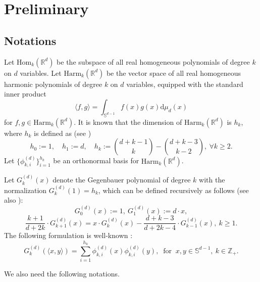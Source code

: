 \documentclass[11pt]{article}
\theoremstyle{definition}
\theoremstyle{remark}
\begin{document}
\section{Preliminary}

\subsection{Notations}

Let $\text{Hom}_{k}(\mathbb{R}^d)$ be the subspace of all real homogeneous polynomials of degree $k$ on $d$ variables.
Let $\text{Harm}_{k}(\mathbb{R}^d)$ be the  vector space of all real homogeneous harmonic
polynomials of degree $k$ on $d$ variables, equipped with the standard inner product
\begin{equation*}
\langle f,g\rangle=\int_{\mathbb{S}^{d-1}}f(  {x})g(  {x})\text{d}\mu_d(  {x})
\end{equation*}
for $f,g\in\text{Harm}_{k}(\mathbb{R}^d)$. 
It is known that the dimension of $\text{Harm}_{k}(\mathbb{R}^d)$ is $h_k$, where $h_k$ is defined as (see \cite[Theorem 3.2]{DGS77})
\begin{equation*}
h_0:=1,\quad h_1:=d,\quad h_k:=\binom{d+k-1}{k}-	\binom{d+k-3}{k-2},\ \forall k\geq 2.
\end{equation*}
Let $\{\phi_{k,i}^{(d)}\}_{i=1}^{h_k}$ be an orthonormal basis for $\text{Harm}_{k}(\mathbb{R}^d)$.

Let $G_k^{(d)}(x)$ denote the
Gegenbauer polynomial of degree $k$ with the normalization $G_k^{(d)}(1)=h_k$, which can be
defined recursively as follows (see also \cite[Definition 2.1]{DGS77}):
\begin{equation*}
G_0^{(d)}(x):=1,\ G_1^{(d)}(x):=d\cdot x,
\end{equation*}
\begin{equation*}
\frac{k+1}{d+2k}\cdot G_{k+1}^{(d)}(x)=x\cdot G_k^{(d)}(x)-\frac{d+k-3}{d+2k-4}\cdot G_{k-1}^{(d)}(x),\ k\geq 1.
\end{equation*}
The following formulation  is  well-known  \cite[Theorem 3.3]{DGS77}:
\begin{equation*}
G_k^{(d)}(\langle   {x},  {y}\rangle)=\sum\limits_{i=1}^{h_k}\phi_{k,i}^{(d)}(  {x})\phi_{k,i}^{(d)}(  {y}),\
\text{ for }\   {x},  {y}\in\mathbb{S}^{d-1},\  k\in\mathbb{Z}_+.
\end{equation*}

We also need the following notations.
\end{document}
